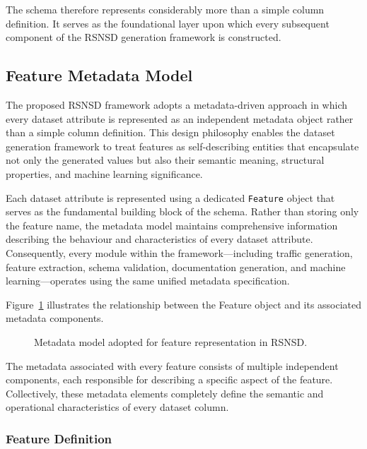 \documentclass[12pt,a4paper]{article}
\begin{document}
The schema therefore represents considerably more than a simple column definition. It serves as the foundational layer upon which every subsequent component of the RSNSD generation framework is constructed.

\subsection{Feature Metadata Model}

The proposed RSNSD framework adopts a metadata-driven approach in which every dataset attribute is represented as an independent metadata object rather than a simple column definition. This design philosophy enables the dataset generation framework to treat features as self-describing entities that encapsulate not only the generated values but also their semantic meaning, structural properties, and machine learning significance.

Each dataset attribute is represented using a dedicated \texttt{Feature} object that serves as the fundamental building block of the schema. Rather than storing only the feature name, the metadata model maintains comprehensive information describing the behaviour and characteristics of every dataset attribute. Consequently, every module within the framework—including traffic generation, feature extraction, schema validation, documentation generation, and machine learning—operates using the same unified metadata specification.

Figure~\ref{fig:feature_metadata_model} illustrates the relationship between the Feature object and its associated metadata components.

\begin{figure}[H]
	\centering
	\caption{Metadata model adopted for feature representation in RSNSD.}
	\label{fig:feature_metadata_model}
\end{figure}

The metadata associated with every feature consists of multiple independent components, each responsible for describing a specific aspect of the feature. Collectively, these metadata elements completely define the semantic and operational characteristics of every dataset column.

\subsubsection{Feature Definition}
\end{document}
